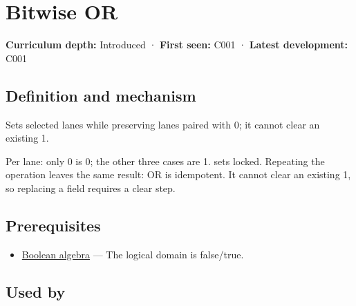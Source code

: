 \hypertarget{appendix-a427ce8ce8a6}{}\label{referencestart:appendix-a427ce8ce8a6}
\section{Bitwise OR}\label{appendix-a427ce8ce8a6-bitwise-or}

\hypertarget{appendix-a427ce8ce8a6-bitwise-or}{}

\textbf{Curriculum depth:} Introduced · \textbf{First seen:} C001 · \textbf{Latest development:} C001

\begin{allmightroledefinition}

\subsection{Definition and mechanism}\label{appendix-a427ce8ce8a6-definition-and-mechanism}

\hypertarget{appendix-a427ce8ce8a6-definition-and-mechanism}{}

Sets selected lanes while preserving lanes paired with 0; it cannot clear an existing 1.

\end{allmightroledefinition}

Per lane: only 0 is 0; the other three cases are 1.  sets locked. Repeating the operation leaves the same result: OR is idempotent. It cannot clear an existing 1, so replacing a field requires a clear step.

\subsection{Prerequisites}\label{appendix-a427ce8ce8a6-prerequisites}

\hypertarget{appendix-a427ce8ce8a6-prerequisites}{}

\begin{itemize}
\tightlist
\item
  \hyperref[appendix-24475e1596a8]{Boolean algebra} --- The logical domain is false/true.
\end{itemize}

\subsection{Used by}\label{appendix-a427ce8ce8a6-used-by}

